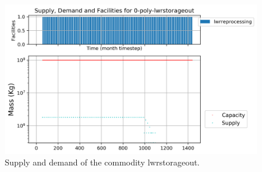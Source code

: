 \documentclass[11pt]{article}
\begin{document}
\begin{figure}[!h]
	\centering
	\includegraphics[width=\textwidth]{29-figures/0-poly-lwrstorageout.png} 
	\hfill
	\caption{Supply and demand of the commodity lwrstorageout.}
	\label{fig:29-storageout1}
\end{figure}
\end{document}
